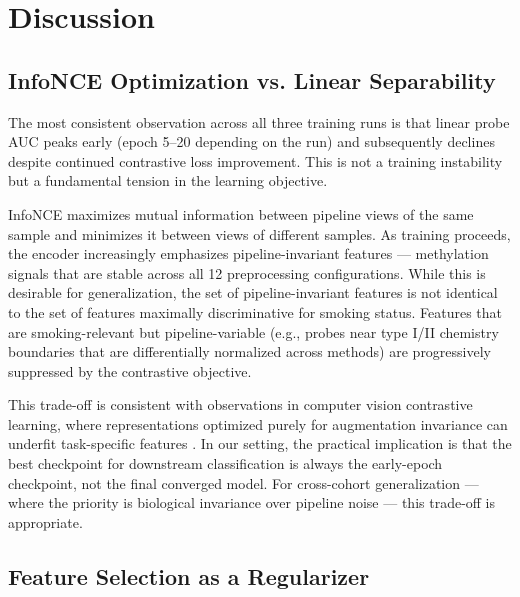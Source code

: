 \documentclass[conference]{IEEEtran}
\begin{document}
\section{Discussion}
\label{sec:discussion}

\subsection{InfoNCE Optimization vs. Linear Separability}

The most consistent observation across all three training runs is that linear probe AUC peaks early (epoch 5--20 depending on the run) and subsequently declines despite continued contrastive loss improvement. This is not a training instability but a fundamental tension in the learning objective.

InfoNCE maximizes mutual information between pipeline views of the same sample and minimizes it between views of different samples. As training proceeds, the encoder increasingly emphasizes pipeline-invariant features — methylation signals that are stable across all 12 preprocessing configurations. While this is desirable for generalization, the set of pipeline-invariant features is not identical to the set of features maximally discriminative for smoking status. Features that are smoking-relevant but pipeline-variable (e.g., probes near type I/II chemistry boundaries that are differentially normalized across methods) are progressively suppressed by the contrastive objective.

This trade-off is consistent with observations in computer vision contrastive learning, where representations optimized purely for augmentation invariance can underfit task-specific features \cite{tian2020}. In our setting, the practical implication is that the best checkpoint for downstream classification is always the early-epoch checkpoint, not the final converged model. For cross-cohort generalization — where the priority is biological invariance over pipeline noise — this trade-off is appropriate.

\subsection{Feature Selection as a Regularizer}
\end{document}
